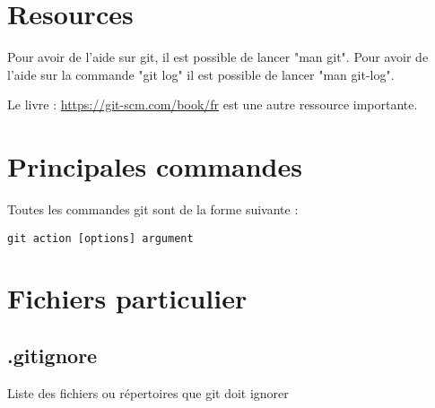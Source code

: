\documentclass[a4paper]{article}
\begin{document}
\section*{Resources}
Pour avoir de l'aide sur git, il est possible de lancer "man git". Pour
avoir de l'aide sur la commande "git log" il est possible de lancer "man
git-log".

Le livre : \url{https://git-scm.com/book/fr} est une autre ressource importante.

\section*{Principales commandes}

Toutes les commandes git sont de la forme suivante : 
\begin{verbatim}
git action [options] argument
\end{verbatim}
























\section*{Fichiers particulier}

\subsection*{.gitignore}
Liste des fichiers ou répertoires que git doit ignorer
\end{document}
